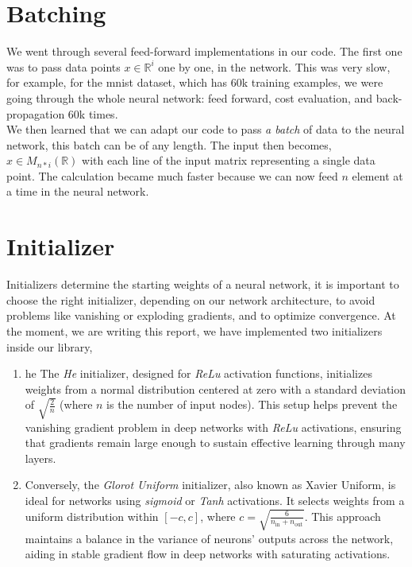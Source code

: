 \documentclass[a4paper, twocolumn, twoside]{article}
\begin{document}
	\section{Batching}
	We went through several feed-forward implementations in our code. The first one was to pass data points $x \in \mathbb{R}^{i}$ one by one, in the network.
    This was very slow, for example, for the mnist dataset, which has 60k training examples,
	we were going through the whole neural network: feed forward, cost evaluation, and back-propagation 60k times.\\
	We then learned that we can adapt our code to pass \textit{a batch} of data to the neural network, this batch can be of any length.
	The input then becomes, $x \in M_{n*i} (\mathbb{R})$ with each line of the input matrix representing a single data point.
	The calculation became much faster because we can now feed $n$ element at a time in the neural network.

	\section{Initializer}
	Initializers determine the starting weights of a neural network, it is important to choose the right initializer, depending on our network architecture, to avoid problems like vanishing or exploding gradients, and to optimize convergence.
	At the moment, we are writing this report, we have implemented two initializers inside our library,

	\begin{enumerate}
		\item{he}
	The \textit{He} initializer, designed for \textit{ReLu} activation functions,
	initializes weights from a normal distribution centered at zero with a standard deviation of 
	$\sqrt{\frac{2}{n}}$ (where $n$ is the number of input nodes).
	This setup helps prevent the vanishing gradient problem in deep networks with \textit{ReLu} activations,
	ensuring that gradients remain large enough to sustain effective learning through many layers.
		\item
	Conversely, the \textit{Glorot Uniform} initializer, 
	also known as Xavier Uniform, is ideal for networks using \textit{sigmoid} or \textit{Tanh} activations.
	It selects weights from a uniform distribution within $[-c, c]$,
	where $c = \sqrt{\frac{6}{n_{\text{in}} + n_{\text{out}}}}$.
	This approach maintains a balance in the variance of neurons' outputs across the network,
	aiding in stable gradient flow in deep networks with saturating activations.
	\end{enumerate}
\end{document}
